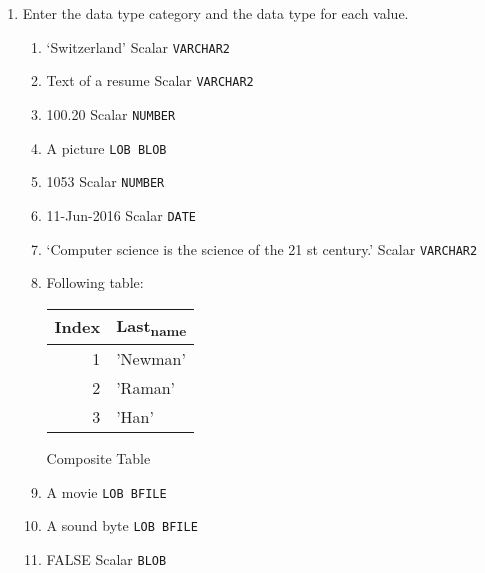 \documentclass[11pt]{article}
\begin{document}
\begin{enumerate}
\item Enter the data type category and the data type for each value.
\begin{enumerate}
\item ‘Switzerland’
Scalar \texttt{VARCHAR2}
\item Text of a resume
Scalar \texttt{VARCHAR2}
\item 100.20
Scalar \texttt{NUMBER}
\item A picture
\texttt{LOB BLOB}
\item 1053
Scalar \texttt{NUMBER}
\item 11-Jun-2016
Scalar \texttt{DATE}
\item ‘Computer science is the science of the 21 st century.’
Scalar \texttt{VARCHAR2}
\item Following table:
\begin{center}
\begin{tabular}{rl}
Index & Last\textsubscript{name}\\[0pt]
\hline
1 & 'Newman'\\[0pt]
2 & 'Raman'\\[0pt]
3 & 'Han'\\[0pt]
\end{tabular}
\end{center}

Composite Table

\item A movie
\texttt{LOB BFILE}
\item A sound byte
\texttt{LOB BFILE}
\item FALSE
Scalar \texttt{BLOB}
\end{enumerate}
\end{enumerate}
\end{document}
